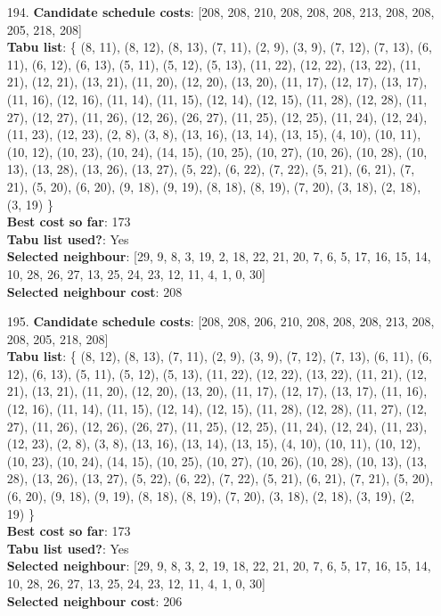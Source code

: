 \documentclass[fleqn]{article}
\begin{document}
\begin{itemize}
    \item[194.] \textbf{Candidate schedule costs}: [208, 208, 210, 208, 208, 208, 213, 208, 208, 205, 218, 208] \\
    \textbf{Tabu list}: \{ (8, 11), (8, 12), (8, 13), (7, 11), (2, 9), (3, 9), (7, 12), (7, 13), (6, 11), (6, 12), (6, 13), (5, 11), (5, 12), (5, 13), (11, 22), (12, 22), (13, 22), (11, 21), (12, 21), (13, 21), (11, 20), (12, 20), (13, 20), (11, 17), (12, 17), (13, 17), (11, 16), (12, 16), (11, 14), (11, 15), (12, 14), (12, 15), (11, 28), (12, 28), (11, 27), (12, 27), (11, 26), (12, 26), (26, 27), (11, 25), (12, 25), (11, 24), (12, 24), (11, 23), (12, 23), (2, 8), (3, 8), (13, 16), (13, 14), (13, 15), (4, 10), (10, 11), (10, 12), (10, 23), (10, 24), (14, 15), (10, 25), (10, 27), (10, 26), (10, 28), (10, 13), (13, 28), (13, 26), (13, 27), (5, 22), (6, 22), (7, 22), (5, 21), (6, 21), (7, 21), (5, 20), (6, 20), (9, 18), (9, 19), (8, 18), (8, 19), (7, 20), (3, 18), (2, 18), (3, 19) \} \\
    \textbf{Best cost so far}: 173 \\
    \textbf{Tabu list used?}: Yes \\
    \textbf{Selected neighbour}: [29, 9, 8, 3, 19, 2, 18, 22, 21, 20, 7, 6, 5, 17, 16, 15, 14, 10, 28, 26, 27, 13, 25, 24, 23, 12, 11, 4, 1, 0, 30] \\
    \textbf{Selected neighbour cost}: 208
      

    \item[195.] \textbf{Candidate schedule costs}: [208, 208, 206, 210, 208, 208, 208, 213, 208, 208, 205, 218, 208] \\
    \textbf{Tabu list}: \{ (8, 12), (8, 13), (7, 11), (2, 9), (3, 9), (7, 12), (7, 13), (6, 11), (6, 12), (6, 13), (5, 11), (5, 12), (5, 13), (11, 22), (12, 22), (13, 22), (11, 21), (12, 21), (13, 21), (11, 20), (12, 20), (13, 20), (11, 17), (12, 17), (13, 17), (11, 16), (12, 16), (11, 14), (11, 15), (12, 14), (12, 15), (11, 28), (12, 28), (11, 27), (12, 27), (11, 26), (12, 26), (26, 27), (11, 25), (12, 25), (11, 24), (12, 24), (11, 23), (12, 23), (2, 8), (3, 8), (13, 16), (13, 14), (13, 15), (4, 10), (10, 11), (10, 12), (10, 23), (10, 24), (14, 15), (10, 25), (10, 27), (10, 26), (10, 28), (10, 13), (13, 28), (13, 26), (13, 27), (5, 22), (6, 22), (7, 22), (5, 21), (6, 21), (7, 21), (5, 20), (6, 20), (9, 18), (9, 19), (8, 18), (8, 19), (7, 20), (3, 18), (2, 18), (3, 19), (2, 19) \} \\
    \textbf{Best cost so far}: 173 \\
    \textbf{Tabu list used?}: Yes \\
    \textbf{Selected neighbour}: [29, 9, 8, 3, 2, 19, 18, 22, 21, 20, 7, 6, 5, 17, 16, 15, 14, 10, 28, 26, 27, 13, 25, 24, 23, 12, 11, 4, 1, 0, 30] \\
    \textbf{Selected neighbour cost}: 206
      


\end{itemize}
\end{document}

